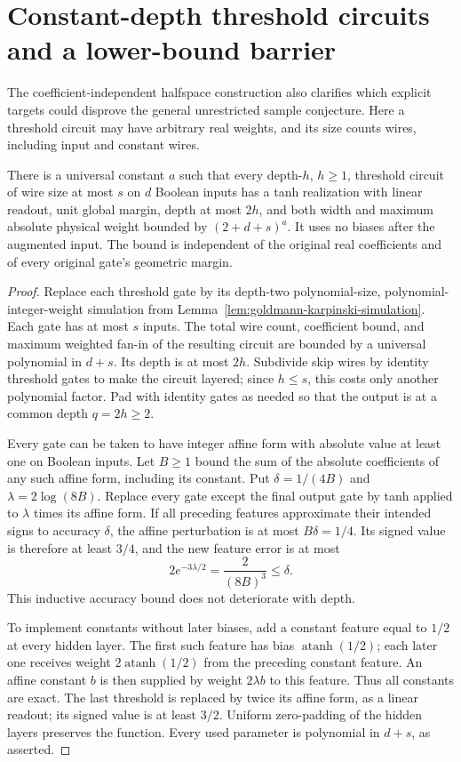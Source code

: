 \section{Constant-depth threshold circuits and a lower-bound barrier}
\label{sec:threshold-circuits}

The coefficient-independent halfspace construction also clarifies which
explicit targets could disprove the general unrestricted sample
conjecture. Here a threshold circuit may have arbitrary real weights,
and its size counts wires, including input and constant wires.

\begin{lemma}
\label{lem:threshold-circuit-tanh}
There is a universal constant $a$ such that every depth-$h$, $h\ge1$, threshold
circuit of wire size at most $s$ on $d$ Boolean inputs has a tanh
realization with linear readout, unit global margin, depth at most
$2h$, and both width and maximum absolute physical weight bounded by
$(2+d+s)^a$. It uses no biases after the augmented input. The bound is
independent of the original real coefficients and of every original
gate's geometric margin.
\end{lemma}

\begin{proof}
Replace each threshold gate by its depth-two polynomial-size,
polynomial-integer-weight simulation from
Lemma~\ref{lem:goldmann-karpinski-simulation}. Each gate has at most
$s$ inputs. The total wire count, coefficient bound, and maximum
weighted fan-in of the resulting circuit are bounded by a universal
polynomial in $d+s$. Its depth is at most $2h$. Subdivide skip wires by
identity threshold gates to make the circuit layered; since $h\le s$,
this costs only another polynomial factor. Pad with identity gates as
needed so that the output is at a common depth $q=2h\ge2$.

Every gate can be taken to have integer affine form with absolute value
at least one on Boolean inputs. Let $B\ge1$ bound the sum of the
absolute coefficients of any such affine form, including its constant.
Put $\delta=1/(4B)$ and $\lambda=2\log(8B)$. Replace every gate except
the final output gate by tanh applied to $\lambda$ times its affine
form. If all preceding features approximate their intended signs to
accuracy $\delta$, the affine perturbation is at most $B\delta=1/4$.
Its signed value is therefore at least $3/4$, and the new feature error
is at most
\[
 2e^{-3\lambda/2}=\frac{2}{(8B)^3}\le\delta.
\]
This inductive accuracy bound does not deteriorate with depth.

To implement constants without later biases, add a constant feature
equal to $1/2$ at every hidden layer. The first such feature has bias
$\operatorname{atanh}(1/2)$; each later one receives weight
$2\operatorname{atanh}(1/2)$ from the preceding constant feature.
An affine constant $b$ is then supplied by weight $2\lambda b$ to
this feature. Thus all constants are exact. The last threshold is
replaced by twice its affine form, as a linear readout; its signed
value is at least $3/2$. Uniform zero-padding of the hidden layers
preserves the function. Every used parameter is polynomial in $d+s$,
as asserted.
\end{proof}

